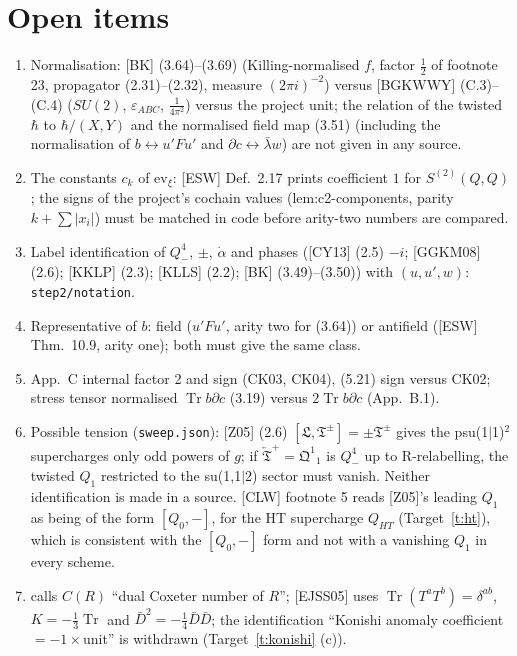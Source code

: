 \documentclass[11pt]{article}
\theoremstyle{definition}
\newcommand{\Tr}{\operatorname{Tr}}
\begin{document}
\section{Open items}
\begin{enumerate}
\item Normalisation: [BK] (3.64)--(3.69) (Killing-normalised $f$, factor $\frac12$ of footnote 23, propagator (2.31)--(2.32), measure $(2\pi i)^{-2}$) versus [BGKWWY] (C.3)--(C.4) ($SU(2)$, $\varepsilon_{ABC}$, $\frac1{4\pi^2}$) versus the project unit; the relation of the twisted $\hbar$ to $\hbar/(X,Y)$ and the normalised field map (3.51) (including the normalisation of $b\leftrightarrow u'Fu'$ and $\partial c\leftrightarrow\bar\lambda w$) are not given in any source.
\item The constants $c_k$ of $\mathrm{ev}_\xi$: [ESW] Def.~2.17 prints coefficient $1$ for $S^{(2)}(Q,Q)$; the signs of the project's cochain values (lem:c2-components, parity $k+\sum|x_i|$) must be matched in code before arity-two numbers are compared.
\item Label identification of $Q^4_-$, $\pm$, $\dot\alpha$ and phases ([CY13] (2.5) $-i$; [GGKM08] (2.6); [KKLP] (2.3); [KLLS] (2.2); [BK] (3.49)--(3.50)) with $(u,u',w)$: \texttt{step2/notation}.
\item Representative of $b$: field ($u'Fu'$, arity two for (3.64)) or antifield ([ESW] Thm.~10.9, arity one); both must give the same class.
\item [BGKWWY] App.~C internal factor 2 and sign (CK03, CK04), (5.21) sign versus CK02; stress tensor normalised $\Tr b\partial c$ (3.19) versus $2\Tr b\partial c$ (App.~B.1).
\item Possible tension (\texttt{sweep.json}): [Z05] (2.6) $[\mathfrak L,\mathfrak T^\pm]=\pm\mathfrak T^\pm$ gives the psu(1$|$1)$^2$ supercharges only odd powers of $g$; if $\overleftarrow{\mathfrak T}^+=\mathfrak Q^1{}_1$ is $Q^4_-$ up to R-relabelling, the twisted $Q_1$ restricted to the su(1,1$|$2) sector must vanish. Neither identification is made in a source. [CLW] footnote 5 reads [Z05]'s leading $Q_1$ as being of the form $[Q_0,-]$, for the HT supercharge $Q_{HT}$ (Target~\ref{t:ht}), which is consistent with the $[Q_0,-]$ form and not with a vanishing $Q_1$ in every scheme.
\item [CL25] calls $C(R)$ ``dual Coxeter number of $R$''; [EJSS05] uses $\Tr(T^aT^b)=\delta^{ab}$, $K=-\frac13\Tr$ and $\bar D^2=-\frac14\bar D\bar D$; the identification ``Konishi anomaly coefficient $=-1\times$unit'' is withdrawn (Target~\ref{t:konishi} (c)).

\end{enumerate}
\end{document}
